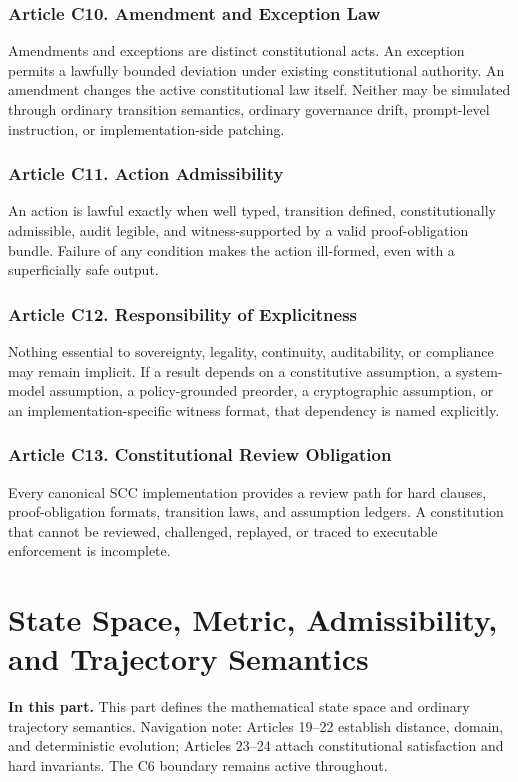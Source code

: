 \documentclass[10pt,oneside]{article}
\theoremstyle{definition}
\theoremstyle{remark}
\newcommand{\PartIntro}[1]{\noindent\textbf{In this part.} #1\par\medskip}
\begin{document}
\section{Article C10. Amendment and Exception Law}
Amendments and exceptions are distinct constitutional acts. An exception permits a lawfully bounded deviation under existing constitutional authority. An amendment changes the active constitutional law itself. Neither may be simulated through ordinary transition semantics, ordinary governance drift, prompt-level instruction, or implementation-side patching.

\section{Article C11. Action Admissibility}
An action is lawful exactly when well typed, transition defined, constitutionally admissible, audit legible, and witness-supported by a valid proof-obligation bundle. Failure of any condition makes the action ill-formed, even with a superficially safe output.

\section{Article C12. Responsibility of Explicitness}
Nothing essential to sovereignty, legality, continuity, auditability, or compliance may remain implicit. If a result depends on a constitutive assumption, a system-model assumption, a policy-grounded preorder, a cryptographic assumption, or an implementation-specific witness format, that dependency is named explicitly.

\section{Article C13. Constitutional Review Obligation}
Every canonical SCC implementation provides a review path for hard clauses, proof-obligation formats, transition laws, and assumption ledgers. A constitution that cannot be reviewed, challenged, replayed, or traced to executable enforcement is incomplete.

\part{State Space, Metric, Admissibility, and Trajectory Semantics}

\PartIntro{This part defines the mathematical state space and ordinary trajectory semantics. Navigation note: Articles 19--22 establish distance, domain, and deterministic evolution; Articles 23--24 attach constitutional satisfaction and hard invariants. The C6 boundary remains active throughout.}
\end{document}
